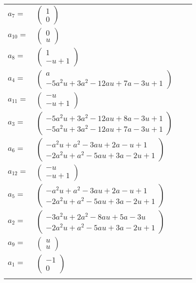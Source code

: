 \documentclass[1p]{elsarticle_modified}
\theoremstyle{definition}
\begin{document}
\begin{tabular}{m{7pt} m{180pt} m{7pt} m{180pt} }
\flushright $a_{7}=$&$\begin{pmatrix}1\\0\end{pmatrix}$ \\
\flushright $a_{10}=$&$\begin{pmatrix}0\\u\end{pmatrix}$ \\
\flushright $a_{8}=$&$\begin{pmatrix}1\\- u+1\end{pmatrix}$ \\
\flushright $a_{4}=$&$\begin{pmatrix}a\\-5 a^2 u+3 a^2-12 a u+7 a-3 u+1\end{pmatrix}$ \\
\flushright $a_{11}=$&$\begin{pmatrix}- u\\- u+1\end{pmatrix}$ \\
\flushright $a_{3}=$&$\begin{pmatrix}-5 a^2 u+3 a^2-12 a u+8 a-3 u+1\\-5 a^2 u+3 a^2-12 a u+7 a-3 u+1\end{pmatrix}$ \\
\flushright $a_{6}=$&$\begin{pmatrix}- a^2 u+a^2-3 a u+2 a- u+1\\-2 a^2 u+a^2-5 a u+3 a-2 u+1\end{pmatrix}$ \\
\flushright $a_{12}=$&$\begin{pmatrix}- u\\- u+1\end{pmatrix}$ \\
\flushright $a_{5}=$&$\begin{pmatrix}- a^2 u+a^2-3 a u+2 a- u+1\\-2 a^2 u+a^2-5 a u+3 a-2 u+1\end{pmatrix}$ \\
\flushright $a_{2}=$&$\begin{pmatrix}-3 a^2 u+2 a^2-8 a u+5 a-3 u\\-2 a^2 u+a^2-5 a u+3 a-2 u+1\end{pmatrix}$ \\
\flushright $a_{9}=$&$\begin{pmatrix}u\\u\end{pmatrix}$ \\
\flushright $a_{1}=$&$\begin{pmatrix}-1\\0\end{pmatrix}$\\&\end{tabular}
\end{document}
